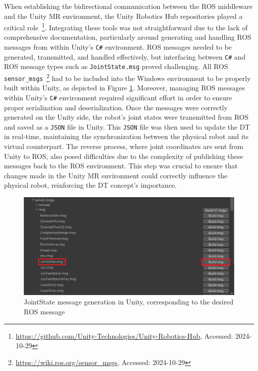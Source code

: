 
When establishing the bidirectional communication between the \ac{ROS} middleware and the Unity \ac{MR} environment, the Unity Robotics Hub repositories played a critical role~\footnote{\url{https://github.com/Unity-Technologies/Unity-Robotics-Hub}, Accessed: 2024-10-29}. Integrating these tools was not straightforward due to the lack of comprehensive documentation, particularly around generating and handling \ac{ROS} messages from within Unity’s \texttt{C\#} environment. \ac{ROS} messages needed to be generated, transmitted, and handled effectively, but interfacing between \texttt{C\#} and \ac{ROS} message types such as \texttt{JointState.msg} proved challenging. All \ac{ROS} \texttt{sensor\_msgs}~\footnote{\url{https://wiki.ros.org/sensor_msgs}, Accessed: 2024-10-29} had to be included into the Windows environment to be properly built within Unity, as depicted in Figure \ref{fig:unityjoint_state_message}. Moreover, managing \ac{ROS} messages within Unity’s \texttt{C\#} environment required significant effort in order to ensure proper serialization and deserialization. Once the messages were correctly generated on the Unity side, the robot's joint states were transmitted from \ac{ROS} and saved as a \texttt{JSON} file in Unity. This \texttt{JSON} file was then used to update the \ac{DT} in real-time, maintaining the synchronization between the physical robot and its virtual counterpart. The reverse process, where joint coordinates are sent from Unity to \ac{ROS}, also posed difficulties due to the complexity of publishing these messages back to the \ac{ROS} environment. This step was crucial to ensure that changes made in the Unity \ac{MR} environment could correctly influence the physical robot, reinforcing the \ac{DT} concept's importance.

\begin{figure}[h]
    \centering
    \includegraphics[width=0.7\linewidth]{figs/unityjoint_state_message.png}
    \caption{JointState message generation in Unity, corresponding to the desired ROS message}
    \label{fig:unityjoint_state_message}
\end{figure}

